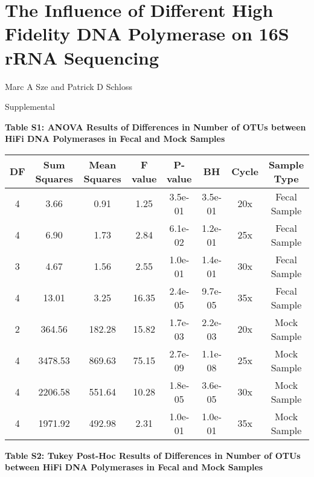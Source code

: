 \documentclass[11pt,]{article}
\title{}
\author{}
\date{}
\begin{document}
\section{The Influence of Different High Fidelity DNA Polymerase on 16S
rRNA
Sequencing}\label{the-influence-of-different-high-fidelity-dna-polymerase-on-16s-rrna-sequencing}

\vspace{10mm}

\begin{center}
Marc A Sze and Patrick D Schloss

\vspace{10mm}

Supplemental
\end{center}

\newpage

\textbf{Table S1: ANOVA Results of Differences in Number of OTUs between
HiFi DNA Polymerases in Fecal and Mock Samples}

\begin{longtable}[]{@{}cccccccc@{}}
\toprule
DF & Sum Squares & Mean Squares & F value & P-value & BH & Cycle &
Sample Type\tabularnewline
\midrule
\endhead
4 & 3.66 & 0.91 & 1.25 & 3.5e-01 & 3.5e-01 & 20x & Fecal
Sample\tabularnewline
4 & 6.90 & 1.73 & 2.84 & 6.1e-02 & 1.2e-01 & 25x & Fecal
Sample\tabularnewline
3 & 4.67 & 1.56 & 2.55 & 1.0e-01 & 1.4e-01 & 30x & Fecal
Sample\tabularnewline
4 & 13.01 & 3.25 & 16.35 & 2.4e-05 & 9.7e-05 & 35x & Fecal
Sample\tabularnewline
2 & 364.56 & 182.28 & 15.82 & 1.7e-03 & 2.2e-03 & 20x & Mock
Sample\tabularnewline
4 & 3478.53 & 869.63 & 75.15 & 2.7e-09 & 1.1e-08 & 25x & Mock
Sample\tabularnewline
4 & 2206.58 & 551.64 & 10.28 & 1.8e-05 & 3.6e-05 & 30x & Mock
Sample\tabularnewline
4 & 1971.92 & 492.98 & 2.31 & 1.0e-01 & 1.0e-01 & 35x & Mock
Sample\tabularnewline
\bottomrule
\end{longtable}

\newpage

\textbf{Table S2: Tukey Post-Hoc Results of Differences in Number of
OTUs between HiFi DNA Polymerases in Fecal and Mock Samples}
\end{document}
